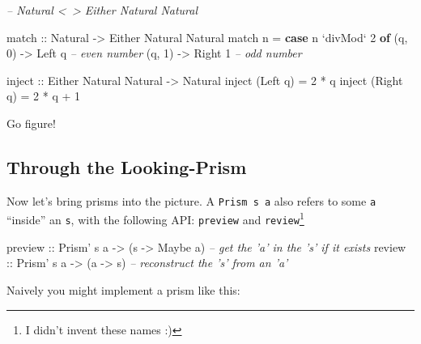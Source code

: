 \documentclass[]{article}
\newenvironment{Shaded}{}{}
\newcommand{\CommentTok}[1]{\textcolor[rgb]{0.38,0.63,0.69}{\textit{#1}}}
\newcommand{\DataTypeTok}[1]{\textcolor[rgb]{0.56,0.13,0.00}{#1}}
\newcommand{\DecValTok}[1]{\textcolor[rgb]{0.25,0.63,0.44}{#1}}
\newcommand{\FunctionTok}[1]{\textcolor[rgb]{0.02,0.16,0.49}{#1}}
\newcommand{\KeywordTok}[1]{\textcolor[rgb]{0.00,0.44,0.13}{\textbf{#1}}}
\newcommand{\NormalTok}[1]{#1}
\newcommand{\OtherTok}[1]{\textcolor[rgb]{0.00,0.44,0.13}{#1}}
\begin{document}
\begin{Shaded}
\begin{Highlighting}[]
\CommentTok{-- Natural <~> Either Natural Natural}

\OtherTok{match ::} \DataTypeTok{Natural} \OtherTok{->} \DataTypeTok{Either} \DataTypeTok{Natural} \DataTypeTok{Natural}
\NormalTok{match n }\FunctionTok{=} \KeywordTok{case}\NormalTok{ n }\OtherTok{`divMod`} \DecValTok{2} \KeywordTok{of}
\NormalTok{    (q, }\DecValTok{0}\NormalTok{) }\OtherTok{->} \DataTypeTok{Left}\NormalTok{  q       }\CommentTok{-- even number}
\NormalTok{    (q, }\DecValTok{1}\NormalTok{) }\OtherTok{->} \DataTypeTok{Right} \DecValTok{1}       \CommentTok{-- odd number}

\OtherTok{inject ::} \DataTypeTok{Either} \DataTypeTok{Natural} \DataTypeTok{Natural} \OtherTok{->} \DataTypeTok{Natural}
\NormalTok{inject (}\DataTypeTok{Left}\NormalTok{  q) }\FunctionTok{=} \DecValTok{2} \FunctionTok{*}\NormalTok{ q}
\NormalTok{inject (}\DataTypeTok{Right}\NormalTok{ q) }\FunctionTok{=} \DecValTok{2} \FunctionTok{*}\NormalTok{ q }\FunctionTok{+} \DecValTok{1}
\end{Highlighting}
\end{Shaded}

Go figure!

\hypertarget{through-the-looking-prism}{%
\subsection{Through the Looking-Prism}\label{through-the-looking-prism}}

Now let's bring prisms into the picture. A
\texttt{Prism\textquotesingle{}\ s\ a} also refers to some \texttt{a} ``inside''
an \texttt{s}, with the following API: \texttt{preview} and
\texttt{review}\footnote{I didn't invent these names :)}

\begin{Shaded}
\begin{Highlighting}[]
\OtherTok{preview ::} \DataTypeTok{Prism'}\NormalTok{ s a }\OtherTok{->}\NormalTok{ (s }\OtherTok{->} \DataTypeTok{Maybe}\NormalTok{ a)   }\CommentTok{-- get the 'a' in the 's' if it exists}
\OtherTok{review  ::} \DataTypeTok{Prism'}\NormalTok{ s a }\OtherTok{->}\NormalTok{ (a }\OtherTok{->}\NormalTok{ s)         }\CommentTok{-- reconstruct the 's' from an 'a'}
\end{Highlighting}
\end{Shaded}

Naively you might implement a prism like this:
\end{document}
